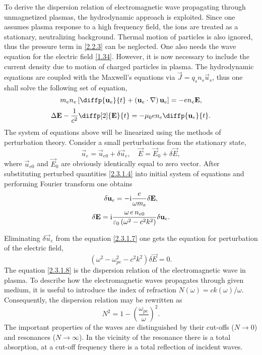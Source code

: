 To derive the dispersion relation of electromagnetic wave propagating through unmagnetized plasmas, the hydrodynamic approach is exploited. Since one assumes plasma response to a high frequency field, the ions are treated as a stationary, neutralizing background. Thermal motion of particles is also ignored, thus the pressure term in \ref{2.2.3} can be neglected. One also needs the wave equation for the electric field \ref{1.34}. However, it is now necessary to include the current density due to motion of charged particles in plasma. The hydrodynamic equations are coupled with the Maxwell's equations via $ \vec{J} = q_s n_s \vec{u}_s $, thus one shall solve the following set of equation,
\begin{equation}
\label{2.3.1.2}
m_e n_e \left[ \diffp{\vec{u}_e}{t} + \left(\vec{u}_e \cdot \nabla \right) \vec{u}_e \right] = - e n_e \vec{E},
\end{equation}
\begin{equation}
\label{2.3.1.3}
\laplace{\vec{E}} - \frac{1}{c^{2}} \diffp[2]{\vec{E}}{t} = - \mu_0 e n_e \diffp{\vec{u}_e}{t}.
\end{equation}
The system of equations above will be linearized using the methods of perturbation theory. Consider a small perturbations from the stationary state,
\begin{equation}
\label{2.3.1.4}
\vec{u}_{e} = \vec{u}_{e0} + \delta \vec{u}_{e}, \quad \vec{E} = \vec{E}_{0} + \delta \vec{E},
\end{equation}
where $ \vec{u}_{e0} $ and $ \vec{E}_{0} $ are obviously identically equal to zero vector. After substituting perturbed quantities \ref{2.3.1.4} into initial system of equations and performing Fourier transform one obtains
\begin{equation}
\label{2.3.1.6}
\delta \mathbf{u}_e = -\mathrm{i} \frac{e}{\omega m_e} \delta \mathbf{E},
\end{equation}
\begin{equation}
\label{2.3.1.7}
\delta \mathbf{E} = \mathrm{i} \frac{\omega \, e \, n_{e0}}{\varepsilon_0 \left(\omega^2 - c^2 k^2 \right)} \delta \mathbf{u}_e.
\end{equation}

Eliminating $ \delta \vec{u}_{e} $ from the equation \ref{2.3.1.7} one gets the equation for perturbation of the electric field,
\begin{equation}
\label{2.3.1.8}
\left(\omega^2 - \omega_{pe}^2 - c^2 k^2 \right) \delta \vec{E} = 0. 
\end{equation}
The equation \ref{2.3.1.8} is the dispersion relation of the electromagnetic wave in plasma. To describe how the electromagnetic waves propagates through given medium, it is useful to introduce the index of refraction $ N \left( \omega \right) =  c k \left( \omega \right) / \omega $. Consequently, the dispersion relation may be rewritten as
\begin{equation}
\label{2.3.1.9}
N^{2} = 1 - \left(\frac{\omega_{pe}}{\omega}\right)^2.
\end{equation} 
The important properties of the waves are distinguished by their cut-offs ($ N \rightarrow 0 $) and resonances ($ N \rightarrow \infty $). In the vicinity of the resonance there is a total absorption, at a cut-off frequency there is a total reflection of incident waves.

